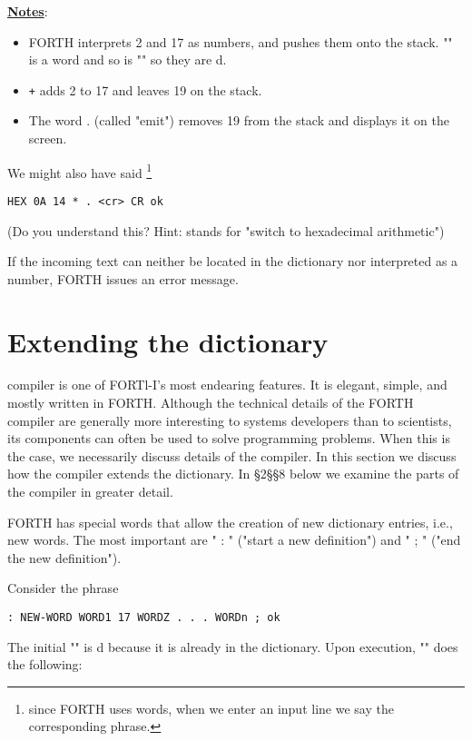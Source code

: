 \underline{\textbf{Notes}}:
\begin{itemize}
  \item FORTH interprets 2 and 17 as numbers, and pushes them onto the stack. "\bc{+}" is a word and so is "" so they are d.
  \item \lstinline$+$ adds 2 to 17 and leaves 19 on the stack.
  \item The word . (called "emit") removes 19 from the stack and displays it on the screen.
\end{itemize}

We might also have said \footnote{since FORTH uses words, when we enter an input line we say the corresponding phrase.}

\begin{lstlisting}
HEX 0A 14 * . <cr> CR ok
\end{lstlisting}

(Do you understand this? Hint:  stands for "switch to hexadecimal arithmetic")

If the incoming text can neither be located in the dictionary nor interpreted as a number, FORTH issues an error message.


\section{Extending the dictionary}

 compiler is one of FORTl-I’s most endearing features. It is elegant, simple, and mostly written in FORTH. Although the technical details of the FORTH compiler are generally more interesting to systems developers than to scientists, its components can often be used to solve programming problems. When this is the case, we necessarily discuss details of the compiler. In this section we discuss how the compiler extends the dictionary. In §2§§8 below we examine the parts of the compiler in greater detail.

FORTH has special words that allow the creation of new dictionary entries, i.e., new words. The most important are " : " ("start a new definition") and " ; " ("end the new definition").

Consider the phrase

\begin{lstlisting}
: NEW-WORD WORD1 17 WORDZ . . . WORDn ; ok
\end{lstlisting}

The initial "\bc{:}" is d because it is already in the dictionary. Upon execution, "\bc{:}" does the following:

